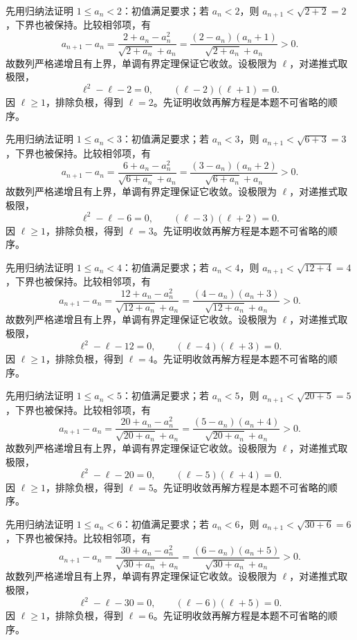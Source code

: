 \documentclass[12pt,fontset=fandol]{ctexart}
\begin{document}
\begin{solve}\label{ans:c1q19}
先用归纳法证明 $1\le a_n<2$：初值满足要求；若 $a_n<2$，则 $a_{n+1}<\sqrt{2+2}=2$，下界也被保持。比较相邻项，有
\[
a_{n+1}-a_n=\frac{2+a_n-a_n^2}{\sqrt{2+a_n}+a_n}=\frac{(2-a_n)(a_n+1)}{\sqrt{2+a_n}+a_n}>0.
\]
故数列严格递增且有上界，单调有界定理保证它收敛。设极限为 $\ell$，对递推式取极限，
\[
\ell^2-\ell-2=0,\qquad(\ell-2)(\ell+1)=0.
\]
因 $\ell\ge1$，排除负根，得到 $\ell=2$。先证明收敛再解方程是本题不可省略的顺序。
\end{solve}

\begin{solve}\label{ans:c1q20}
先用归纳法证明 $1\le a_n<3$：初值满足要求；若 $a_n<3$，则 $a_{n+1}<\sqrt{6+3}=3$，下界也被保持。比较相邻项，有
\[
a_{n+1}-a_n=\frac{6+a_n-a_n^2}{\sqrt{6+a_n}+a_n}=\frac{(3-a_n)(a_n+2)}{\sqrt{6+a_n}+a_n}>0.
\]
故数列严格递增且有上界，单调有界定理保证它收敛。设极限为 $\ell$，对递推式取极限，
\[
\ell^2-\ell-6=0,\qquad(\ell-3)(\ell+2)=0.
\]
因 $\ell\ge1$，排除负根，得到 $\ell=3$。先证明收敛再解方程是本题不可省略的顺序。
\end{solve}

\begin{solve}\label{ans:c1q21}
先用归纳法证明 $1\le a_n<4$：初值满足要求；若 $a_n<4$，则 $a_{n+1}<\sqrt{12+4}=4$，下界也被保持。比较相邻项，有
\[
a_{n+1}-a_n=\frac{12+a_n-a_n^2}{\sqrt{12+a_n}+a_n}=\frac{(4-a_n)(a_n+3)}{\sqrt{12+a_n}+a_n}>0.
\]
故数列严格递增且有上界，单调有界定理保证它收敛。设极限为 $\ell$，对递推式取极限，
\[
\ell^2-\ell-12=0,\qquad(\ell-4)(\ell+3)=0.
\]
因 $\ell\ge1$，排除负根，得到 $\ell=4$。先证明收敛再解方程是本题不可省略的顺序。
\end{solve}

\begin{solve}\label{ans:c1q22}
先用归纳法证明 $1\le a_n<5$：初值满足要求；若 $a_n<5$，则 $a_{n+1}<\sqrt{20+5}=5$，下界也被保持。比较相邻项，有
\[
a_{n+1}-a_n=\frac{20+a_n-a_n^2}{\sqrt{20+a_n}+a_n}=\frac{(5-a_n)(a_n+4)}{\sqrt{20+a_n}+a_n}>0.
\]
故数列严格递增且有上界，单调有界定理保证它收敛。设极限为 $\ell$，对递推式取极限，
\[
\ell^2-\ell-20=0,\qquad(\ell-5)(\ell+4)=0.
\]
因 $\ell\ge1$，排除负根，得到 $\ell=5$。先证明收敛再解方程是本题不可省略的顺序。
\end{solve}

\begin{solve}\label{ans:c1q23}
先用归纳法证明 $1\le a_n<6$：初值满足要求；若 $a_n<6$，则 $a_{n+1}<\sqrt{30+6}=6$，下界也被保持。比较相邻项，有
\[
a_{n+1}-a_n=\frac{30+a_n-a_n^2}{\sqrt{30+a_n}+a_n}=\frac{(6-a_n)(a_n+5)}{\sqrt{30+a_n}+a_n}>0.
\]
故数列严格递增且有上界，单调有界定理保证它收敛。设极限为 $\ell$，对递推式取极限，
\[
\ell^2-\ell-30=0,\qquad(\ell-6)(\ell+5)=0.
\]
因 $\ell\ge1$，排除负根，得到 $\ell=6$。先证明收敛再解方程是本题不可省略的顺序。
\end{solve}
\end{document}
